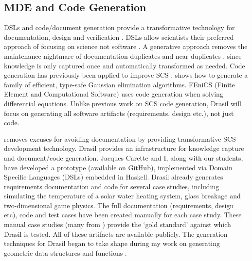 \documentclass[12pt]{article}
\begin{document}
\subsection{MDE and Code Generation}

DSLs and code/document generation provide a transformative technology for
documentation, design and verification \citep{JohansonAndHasselbring2018,
  Smith2018}.  DSLs allow scientists their preferred approach of focusing on
science not software \citep{Kelly2007}.  A generative approach removes the
maintenance nightmare of documentation duplicates and near duplicates
\citep{LucivEtAl2018}, since knowledge is only captured once and automatically
transformed as needed.  Code generation has previously been applied to improve
SCS \citep{WhaleyEtAl2001, Veldhuizen1998, Pueschel2001}.
\citet{Carette2008} shows how to generate a family
of efficient, type-safe Gaussian elimination algorithms.  FEniCS (Finite Element
and Computational Software) \citep{LoggEtAl2012} uses code generation when
solving differential equations.  Unlike previous work on SCS code generation,
Drasil will focus on generating all software artifacts (requirements, design
etc.), not just code.

\citet{SzymczakEtAl2016} removes excuses for avoiding documentation by providing
transformative SCS development technology.  Drasil provides an infrastructure
for knowledge capture and document/code generation.  Jacques Carette and I,
along with our students, have developed a prototype (available on GitHub),
implemented via Domain Specific Languages (DSLs) embedded in Haskell.  Drasil
already generates requirements documentation and code for several case studies,
including simulating the temperature of a solar water heating system, glass
breakage and two-dimensional game physics.  The full documentation
(requirements, design etc), code and test cases have been created manually for
each case study.  These manual case studies (many from \citet{SmithJegatheesanAndKelly2016})
provide the `gold standard' against which Drasil is tested.  All of these
artifacts are available publicly.  The generation techniques for Drasil began to
take shape during my work on generating geometric data structures and functions
\citep{CaretteEtAl2011}.
\end{document}
